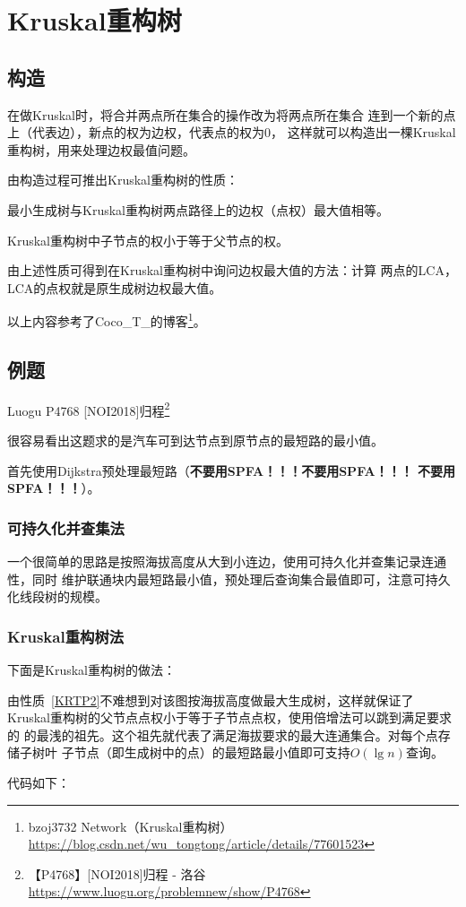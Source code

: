 \section{Kruskal重构树}
\subsection{构造}
在做Kruskal时，将合并两点所在集合的操作改为将两点所在集合
连到一个新的点上（代表边），新点的权为边权，代表点的权为0，
这样就可以构造出一棵Kruskal重构树，用来处理边权最值问题。

由构造过程可推出Kruskal重构树的性质：

\begin{property}
    最小生成树与Kruskal重构树两点路径上的边权（点权）最大值相等。
\end{property}
\begin{property}\label{KRTP2}
    Kruskal重构树中子节点的权小于等于父节点的权。
\end{property}
由上述性质可得到在Kruskal重构树中询问边权最大值的方法：计算
两点的LCA，LCA的点权就是原生成树边权最大值。

以上内容参考了Coco\_T\_的博客\footnote{
    bzoj3732 Network（Kruskal重构树）
    \url{https://blog.csdn.net/wu_tongtong/article/details/77601523}
}。
\subsection{例题}
Luogu P4768 [NOI2018]归程\footnote{
    【P4768】[NOI2018]归程 - 洛谷
    \url{https://www.luogu.org/problemnew/show/P4768}
}

很容易看出这题求的是汽车可到达节点到原节点的最短路的最小值。

首先使用Dijkstra预处理最短路（{\bfseries 不要用SPFA！！！不要用SPFA！！！
不要用SPFA！！！}）。

\subsubsection{可持久化并查集法}
一个很简单的思路是按照海拔高度从大到小连边，使用可持久化并查集记录连通性，同时
维护联通块内最短路最小值，预处理后查询集合最值即可，注意可持久化线段树的规模。

\subsubsection{Kruskal重构树法}
下面是Kruskal重构树的做法：

由性质~\ref{KRTP2}不难想到对该图按海拔高度做最大生成树，这样就保证了
Kruskal重构树的父节点点权小于等于子节点点权，使用倍增法可以跳到满足要求的
的最浅的祖先。这个祖先就代表了满足海拔要求的最大连通集合。对每个点存储子树叶
子节点（即生成树中的点）的最短路最小值即可支持$O(\lg n)$查询。

代码如下：

